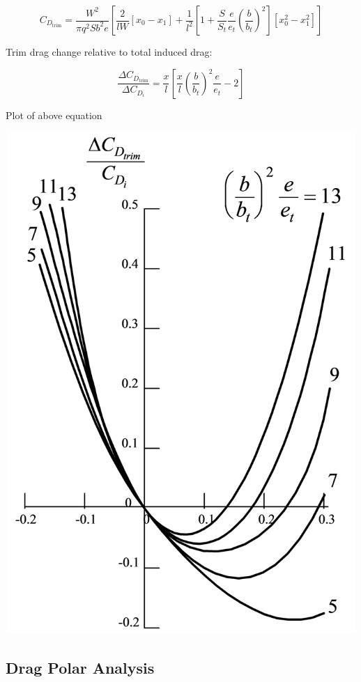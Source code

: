 \documentclass[
]{book}
\begin{document}
\[C_{D_{\mathrm{trim}}} = \frac{W^2}{\pi q^2 Sb^2e} \left[\frac{2}{lW}\left[x_0 - x_1\right] + \frac{1}{l^2} \left[1 + \frac{S}{S_t} \frac{e}{e_t} \left(\frac{b}{b_t}\right)^2\right] \left[x_0^2 - x_1^2\right] \right]\]

Trim drag change relative to total induced drag:

\[\frac{\Delta C_{D_{\mathrm{trim}}}}{\Delta C_{D_i}} = \frac{x}{l} \left[\frac{x}{l} \left(\frac{b}{b_t}\right)^2 \frac{e}{e_t} - 2 \right] \]

Plot of above equation

\includegraphics[width=6.5in,height=7.507in]{media/05/image89.svg}

\hypertarget{drag-polar-analysis}{%
\subsection{Drag Polar Analysis}\label{drag-polar-analysis}}
\end{document}
